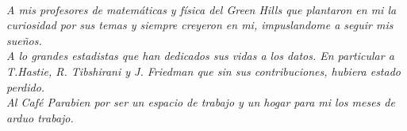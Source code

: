 \documentclass[../Main/Main.tex]{subfiles}
\begin{document}
\begin{flushright}
	\\
	\emph{A mis profesores de matemáticas y física del Green Hills que plantaron en mi la curiosidad por sus temas y siempre creyeron en mi, impuslandome a seguir mis sueños.}
	\\	
	\emph{A lo grandes estadistas que han dedicados sus vidas a los datos. En particular a T.Hastie, R. Tibshirani y J. Friedman que sin sus contribuciones, hubiera estado perdido.} 
	\\
	\emph{Al Café Parabien por ser un espacio de trabajo y un hogar para mi los meses de arduo trabajo.}
	\null
\end{flushright}
\end{document}
